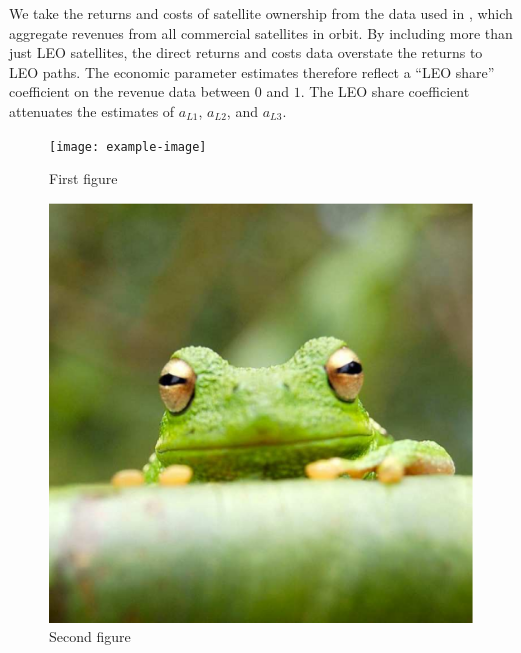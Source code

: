 \documentclass[9pt,twoside,lineno]{pnas-new}
\begin{document}
We take the returns and costs of satellite ownership from the data used in \citet{wienzierl2018}, which aggregate revenues from all commercial satellites in orbit. By including more than just LEO satellites, the direct returns and costs data overstate the returns to LEO paths. The economic parameter estimates therefore reflect a ``LEO share'' coefficient on the revenue data between $0$ and $1$. The LEO share coefficient attenuates the estimates of $a_{L 1}$, $a_{L 2}$, and $a_{L 3}$.


\begin{figure}
\centering
\texttt{[image: example-image]}
\caption{First figure}
\end{figure}

\begin{figure}
\centering
\includegraphics[width=\textwidth]{frog}
\caption{Second figure}
\end{figure}

%

\FloatBarrier





\end{document}
